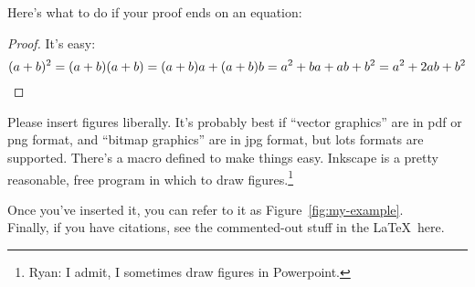 \bigskip

Here's what to do if your proof ends on an equation:
\begin{proof}
It's easy:
\[
    (a+b)^2 = (a+b)(a+b) = (a+b)a + (a+b)b = a^2 + ba + ab + b^2 = a^2 + 2ab + b^2 \qedhere
\]
\end{proof}

Please insert figures liberally.  It's probably best if ``vector graphics'' are in pdf or png format, and ``bitmap graphics'' are in jpg format, but lots formats are supported.  There's a macro defined to make things easy.  Inkscape is a pretty reasonable, free program in which to draw figures.\footnote{Ryan: I admit, I sometimes draw figures in Powerpoint.}
 
{}

Once you've inserted it, you can refer to it as Figure~\ref{fig:my-example}.\\

Finally, if you have citations, see the commented-out stuff in the \LaTeX~here.

%

